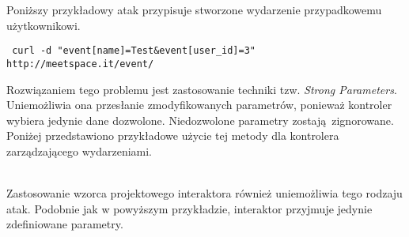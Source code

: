 Poniższy przykładowy atak przypisuje stworzone wydarzenie przypadkowemu użytkownikowi.

\texttt{ \footnotesize curl -d "event[name]=Test\&event[user\_id]=3" http://meetspace.it/event/ }

Rozwiązaniem tego problemu jest zastosowanie techniki tzw. \emph{Strong Parameters}. Uniemożliwia ona przesłanie zmodyfikowanych parametrów, ponieważ kontroler wybiera jedynie dane dozwolone. Niedozwolone parametry zostają zignorowane. Poniżej przedstawiono przykładowe użycie tej metody dla kontrolera zarządzającego wydarzeniami.

\begin{code}
  
\end{code}\\
Zastosowanie wzorca projektowego interaktora również uniemożliwia tego rodzaju atak. Podobnie jak w powyższym przykładzie, interaktor przyjmuje jedynie zdefiniowane parametry.

\begin{code}
  
\end{code}\\
